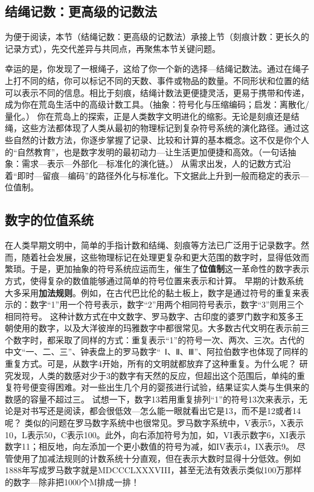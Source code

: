 \subsection*{结绳记数：更高级的记数法}


为便于阅读，本节（结绳记数：更高级的记数法）承接上节（刻痕计数：更长久的记录方式），先交代差异与共同点，再聚焦本节关键问题。

幸运的是，你发现了一根绳子，这给了你一个新的选择---结绳记数法。通过在绳子上打不同的结，你可以标记不同的天数、事件或物品的数量。不同形状和位置的结可以表示不同的信息。相比于刻痕，结绳计数法更便捷灵活，更易于携带和传递，成为你在荒岛生活中的高级计数工具。{（抽象：符号化与压缩编码；启发：离散化/量化。）}
你在荒岛上的探索，正是人类数字文明进化的缩影。无论是刻痕还是结绳，这些方法都体现了人类从最初的物理标记到复杂符号系统的演化路径。通过这些自然的计数方法，你逐步掌握了记录、比较和计算的基本概念。这不仅是你个人的“自然教育”，也是数字发明的最初动力---让生活更加便捷和高效。{（一句话抽象：需求—表示—外部化—标准化的演化链。）}
从需求出发，人的记数方式沿着“即时—留痕—编码”的路径外化与标准化。下文据此上升到一般而稳定的表示---位值制。
\subsection{数字的位值系统}


在人类早期文明中，简单的手指计数和结绳、刻痕等方法已广泛用于记录数字。然而，随着社会发展，这些物理标记在处理更复杂和更大范围的数字时，显得低效而繁琐。于是，更加抽象的符号系统应运而生，催生了{\bf 位值制}这一革命性的数字表示方式，使得复杂的数值能够通过简单的符号位置来表示和计算。
早期的计数系统大多采用{\bf 加法规则}。例如，在古代巴比伦的黏土板上，数字是通过符号的重复来表示的：数字“1”用一个符号表示，数字“2”用两个相同符号表示，数字“3”则用三个相同符号。
这种计数方式在中文数字、罗马数字、古印度的婆罗门数字和笈多王朝使用的数字，以及大洋彼岸的玛雅数字中都很常见。大多数古代文明在表示前三个数字时，都采取了同样的方式：重复表示“1”的符号一次、两次、三次。古代的中文“一、二、三”、钟表盘上的罗马数字“~Ⅰ、Ⅱ、Ⅲ”、阿拉伯数字也体现了同样的重复方式。可是，从数字4开始，所有的文明就都放弃了这种重复。为什么呢？
研究发现，人类的数感对少于3的数字有天然的反应，但超出这个范围后，单纯的重复符号便变得困难。对一些出生几个月的婴孩进行试验，结果证实人类与生俱来的数感的容量不超过三。
试想一下，数字13若用重复排列“1”的符号13次来表示，无论是对书写还是阅读，都会很低效---怎么能一眼就看出它是13，而不是12或者14呢？
类似的问题在罗马数字系统中也很常见。罗马数字系统中，V表示5，X表示10，L表示50，C表示100。此外，向右添加符号为加，如，VI表示数字6，XI表示数字11；相反地，向左添加一个更小数值的符号为减，如IV表示4，IX表示9。
尽管使用了加减法规则的计数系统十分直观，但在表示大数时显得十分低效。例如1888年写成罗马数字就是MDCCCLXXXVIII，甚至无法有效表示类似100万那样的数字---除非把1000个M排成一排！

